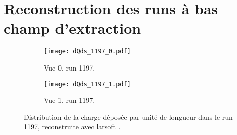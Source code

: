 %
%

  \section{Reconstruction des runs à bas champ d'extraction}\label{sec::rawdatasoft}

    \begin{figure}[htbp]
      \centering
      \begin{subfigure}[t]{0.48\textwidth}
        \centering
        \texttt{[image: dQds\_1197\_0.pdf]}
        \caption{Vue 0, run 1197.}
      \end{subfigure}\hfill
      \begin{subfigure}[t]{0.48\textwidth}
        \centering
        \texttt{[image: dQds\_1197\_1.pdf]}
        \caption{Vue 1, run 1197.}
      \end{subfigure}
      \caption[Distribution de la charge déposée par unité de longueur dans le \TOO{}]{\label{fig::dqds_1197}Distribution de la charge déposée par unité de longueur dans le run 1197, reconstruite avec \gls{larsoft} .}
    \end{figure}

